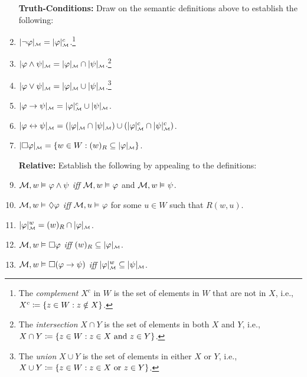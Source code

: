 \documentclass[a4paper, 11pt]{article} %
\begin{document}
\begin{enumerate}[leftmargin=1.2in,itemsep=1pt]
	\item[\bf Truth-Conditions:] Draw on the semantic definitions above to establish the following:
    \item $\interpret{\M}{\neg \metaA} = \interpret{\M}{\metaA}^c$.\footnote{The \textit{complement} $X^c$ in $W$ is the set of elements in $W$ that are not in $X$, i.e., $X^c \coloneq \set{z \in W : z \notin X}$.}
    \item $\interpret{\M}{\metaA \wedge \metaB} = \interpret{\M}{\metaA} \cap \interpret{\M}{\metaB}$.\footnote{The \textit{intersection} $X\cap Y$ is the set of elements in both $X$ and $Y$, i.e., $X \cap Y \coloneq \set{z \in W : z \in X ~\text{and}~ z \in Y}$.}
    \item $\interpret{\M}{\metaA \vee \metaB} = \interpret{\M}{\metaA} \cup \interpret{\M}{\metaB}$.\footnote{The \textit{union} $X \cup Y$ is the set of elements in either $X$ or $Y$, i.e., $X \cup Y \coloneq \set{z \in W : z \in X ~\text{or}~ z \in Y}$.}
    \item $\interpret{\M}{\metaA \rightarrow \metaB} = \interpret{\M}{\metaA}^c \cup \interpret{\M}{\metaB}$.
    \item $\interpret{\M}{\metaA \leftrightarrow \metaB} = (\interpret{\M}{\metaA} \cap \interpret{\M}{\metaB}) \cup (\interpret{\M}{\metaA}^c \cap \interpret{\M}{\metaB}^c)$.
    \item $\interpret{\M}{\Box \metaA} = \set{w \in W : (w)_R \subseteq \interpret{\M}{\metaA}}$.
	\item[\bf Relative:] Establish the following by appealing to the definitions:
    \item $\M, w \MLmodels[] \metaA \wedge \metaB$ \textit{iff} $\M, w \MLmodels \metaA$ and $\M, w \MLmodels \metaB$.
    \item $\M, w \MLmodels[] \Diamond\metaA$ \textit{iff} $\M, u \MLmodels \metaA$ for some $u \in W$ such that $R(w, u)$.
    \item $\interpret{\M}{\metaA}^w = (w)_R \cap \interpret{\M}{\metaA}$.
    \item $\M, w \MLmodels[] \Box\metaA$ \textit{iff} $(w)_R \subseteq \interpret{\M}{\metaA}$.
    \item $\M, w \MLmodels[] \Box(\metaA \rightarrow \metaB)$ \textit{iff} $\interpret{\M}{\metaA}^w \subseteq \interpret{\M}{\metaB}$.

\end{enumerate}
\end{document}

